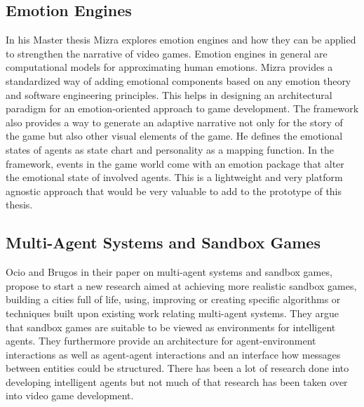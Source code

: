 \subsection{Emotion Engines}
In his Master thesis Mizra explores emotion engines and how they can be applied to strengthen the narrative of video games. Emotion engines in general are computational models for approximating human emotions. Mizra provides a standardized way of adding emotional components based on any emotion theory and software engineering principles. This helps in designing an architectural paradigm for an emotion-oriented approach to game development. The framework also provides a way to generate an adaptive narrative not only for the story of the game but also other visual elements of the game. He defines the emotional states of agents as state chart and personality as a mapping function. In the framework, events in the game world come with an emotion package that alter the emotional state of involved agents. This is a lightweight and very platform agnostic approach that would be very valuable to add to the prototype of this thesis.~\cite{Mizra2021}
\subsection{Multi-Agent Systems and Sandbox Games}
Ocio and Brugos in their paper on multi-agent systems and sandbox games, propose to start a new research aimed at achieving more realistic sandbox games, building a cities full of life, using, improving or creating specific algorithms or techniques built upon existing work relating multi-agent systems. They argue that sandbox games are suitable to be viewed as environments for intelligent agents. They furthermore provide an architecture for agent-environment interactions as well as agent-agent interactions and an interface how messages between entities could be structured. There has been a lot of research done into developing intelligent agents but not much of that research has been taken over into video game development.~\cite{Barriales2009}